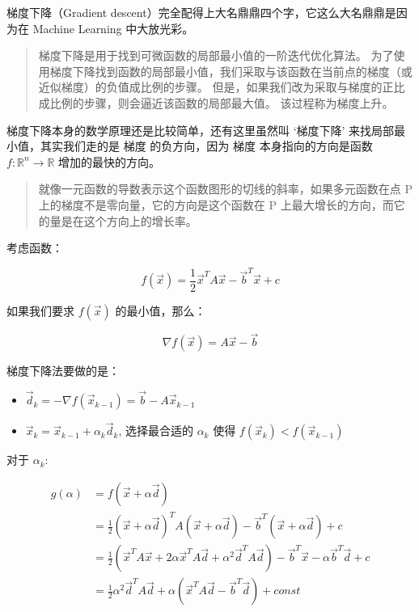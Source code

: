 \documentclass[
]{book}
\providecommand{\tightlist}{%
  \setlength{\itemsep}{0pt}\setlength{\parskip}{0pt}}
\begin{document}
梯度下降（Gradient descent）完全配得上大名鼎鼎四个字，它这么大名鼎鼎是因为在 Machine Learning 中大放光彩。

\begin{quote}
梯度下降是用于找到可微函数的局部最小值的一阶迭代优化算法。 为了使用梯度下降找到函数的局部最小值，我们采取与该函数在当前点的梯度（或近似梯度）的负值成比例的步骤。 但是，如果我们改为采取与梯度的正比成比例的步骤，则会逼近该函数的局部最大值。 该过程称为梯度上升。
\end{quote}

梯度下降本身的数学原理还是比较简单，还有这里虽然叫 `梯度下降' 来找局部最小值，其实我们走的是 梯度 的负方向，因为 梯度 本身指向的方向是函数 \(f: \mathbb{R}^n \to \mathbb{R}\) 增加的最快的方向。

\begin{quote}
就像一元函数的导数表示这个函数图形的切线的斜率，如果多元函数在点 P 上的梯度不是零向量，它的方向是这个函数在 P 上最大增长的方向，而它的量是在这个方向上的增长率。
\end{quote}

考虑函数：

\[
f(\vec{x}) = \frac{1}{2} \vec{x}^TA\vec{x} - \vec{b}^T \vec{x} + c
\]

如果我们要求 \(f(\vec{x})\) 的最小值，那么：

\[
 \nabla f(\vec{x}) = A\vec{x} - \vec{b}
\]

梯度下降法要做的是：

\begin{itemize}
\tightlist
\item
  \(\vec{d}_k = -\nabla f(\vec{x}_{k-1}) = \vec{b} - A \vec{x}_{k-1}\)
\item
  \(\vec{x}_k = \vec{x}_{k-1} + \alpha_k \vec{d}_k\), 选择最合适的 \(\alpha_k\) 使得 \(f(\vec{x}_k) < f(\vec{x}_{k-1})\)
\end{itemize}

对于 \(\alpha_k\):

\[
\begin{aligned}
g(\alpha) &= f(\vec{x} + \alpha \vec{d})  \\
&= \frac{1}{2} (\vec{x} + \alpha \vec{d})^T A (\vec{x} + \alpha \vec{d}) - \vec{b}^T (\vec{x} + \alpha \vec{d}) + c \\
&= \frac{1}{2} (\vec{x}^T A \vec{x} + 2 \alpha \vec{x}^T A \vec{d} + \alpha^2 \vec{d}^T A \vec{d}) - \vec{b}^T \vec{x} - \alpha \vec{b}^T \vec{d} + c \\
&= \frac{1}{2} \alpha^2 \vec{d}^T A \vec{d} + \alpha (\vec{x}^TA\vec{d} - \vec{b}^T\vec{d}) + const
\end{aligned}
\]
\end{document}
